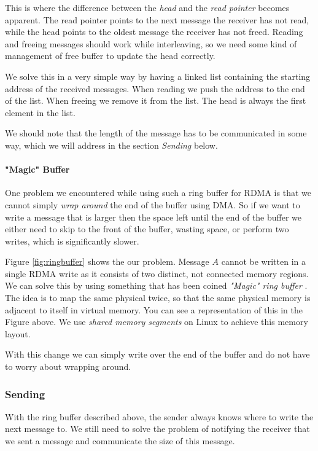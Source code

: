 This is where the difference between the \emph{head} and the \emph{read pointer} becomes apparent. The read pointer points 
to the next message the receiver has not read, while the head points to the oldest message the receiver has not freed. Reading
and freeing messages should work while interleaving, so we need some kind of management of free buffer to update the head 
correctly.

We solve this in a very simple way by having a linked list containing the starting address of the received messages. When
reading we push the address to the end of the list. When freeing we remove it from the list. The head is always the first 
element in the list.

We should note that the length of the message has to be communicated in some way, which we will address in the section 
\emph{Sending} below.





\paragraph{"Magic" Buffer} One problem we encountered while using such a ring buffer for RDMA is that we cannot simply 
\emph{wrap around} the end of the buffer using DMA. So if we want to write a message that is larger then the space left until
the end of the buffer we either need to skip to the front of the buffer, wasting space, or perform two writes, which is 
significantly slower.

Figure \ref{fig:ringbuffer} shows the our problem. Message $A$ cannot be written in a single RDMA write as it consists of 
two distinct, not connected memory regions. We can solve this by using something that has been coined 
\emph{"Magic" ring buffer} . The idea is to map the same physical twice,
so that the same physical memory is adjacent to itself in virtual memory. You can see a representation of this in the 
Figure above. We use \emph{shared memory segments} on Linux to achieve this memory layout.

With this change we can simply write over the end of the buffer and do not have to worry about wrapping around.

\subsubsection{Sending} \label{sec:conn:write:sender}
With the ring buffer described above, the sender always knows where to write the next message to. We still need to solve
the problem of notifying the receiver that we sent a message and communicate the size of this message.

